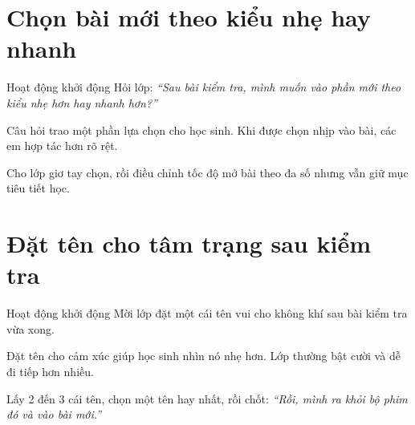 \section{Chọn bài mới theo kiểu nhẹ hay nhanh}
\begin{khoidongbox}{Hoạt động khởi động}
Hỏi lớp: \textit{``Sau bài kiểm tra, mình muốn vào phần mới theo kiểu nhẹ hơn hay nhanh hơn?''}
\end{khoidongbox}
\begin{visaohieuqua}
Câu hỏi trao một phần lựa chọn cho học sinh. Khi được chọn nhịp vào bài, các em hợp tác hơn rõ rệt.
\end{visaohieuqua}
\begin{cachlam5phut}
Cho lớp giơ tay chọn, rồi điều chỉnh tốc độ mở bài theo đa số nhưng vẫn giữ mục tiêu tiết học.
\end{cachlam5phut}
\ngancach

\section{Đặt tên cho tâm trạng sau kiểm tra}
\begin{khoidongbox}{Hoạt động khởi động}
Mời lớp đặt một cái tên vui cho không khí sau bài kiểm tra vừa xong.
\end{khoidongbox}
\begin{visaohieuqua}
Đặt tên cho cảm xúc giúp học sinh nhìn nó nhẹ hơn. Lớp thường bật cười và dễ đi tiếp hơn nhiều.
\end{visaohieuqua}
\begin{cachlam5phut}
Lấy 2 đến 3 cái tên, chọn một tên hay nhất, rồi chốt: \textit{``Rồi, mình ra khỏi bộ phim đó và vào bài mới.''}
\end{cachlam5phut}